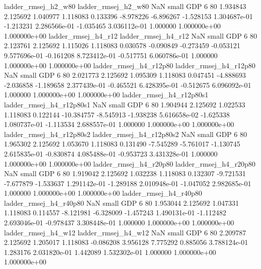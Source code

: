      ladder_rmsej_h2_w80      ladder_rmsej_h2_w80                   NaN      small      GDP                 6 80 1.934843       2.125692 1.040977       1.118083    0.133396     -8.978226     -6.896267    -1.528153   1.304687e-01 -1.213231 2.286566e-01    -1.035465   3.036112e-01            1.000000    1.000000e+00        1.000000e+00
     ladder_rmsej_h4_r12      ladder_rmsej_h4_r12                   NaN      small      GDP                 6 80 2.123761       2.125692 1.115026       1.118083    0.030578     -0.090849     -0.273459    -0.053121   9.577696e-01 -0.161208 8.723412e-01    -0.517751   6.060786e-01            1.000000    1.000000e+00        1.000000e+00
  ladder_rmsej_h4_r12p80   ladder_rmsej_h4_r12p80                   NaN      small      GDP                 6 80 2.021773       2.125692 1.095309       1.118083    0.047451     -4.888693     -2.036858    -1.189658   2.377439e-01 -0.465521 6.428395e-01    -0.512675   6.096092e-01            1.000000    1.000000e+00        1.000000e+00
ladder_rmsej_h4_r12p80s1 ladder_rmsej_h4_r12p80s1                   NaN      small      GDP                 6 80 1.904944       2.125692 1.022533       1.118083    0.122144    -10.384757     -8.545913    -1.938238   5.616658e-02 -1.625338 1.080737e-01    -1.113534   2.688557e-01            1.000000    1.000000e+00        1.000000e+00
ladder_rmsej_h4_r12p80s2 ladder_rmsej_h4_r12p80s2                   NaN      small      GDP                 6 80 1.965302       2.125692 1.053670       1.118083    0.131490     -7.545289     -5.761017    -1.130745   2.615835e-01 -0.830874 4.085488e-01    -0.953723   3.431328e-01            1.000000    1.000000e+00        1.000000e+00
  ladder_rmsej_h4_r20p80   ladder_rmsej_h4_r20p80                   NaN      small      GDP                 6 80 1.919042       2.125692 1.032238       1.118083    0.132307     -9.721531     -7.677879    -1.533637   1.291142e-01 -1.289188 2.010948e-01    -1.047052   2.982685e-01            1.000000    1.000000e+00        1.000000e+00
  ladder_rmsej_h4_r40p80   ladder_rmsej_h4_r40p80                   NaN      small      GDP                 6 80 1.953044       2.125692 1.047331       1.118083    0.114557     -8.121981     -6.328009    -1.457243   1.490131e-01 -1.112482 2.693046e-01    -0.978437   3.308448e-01            1.000000    1.000000e+00        1.000000e+00
     ladder_rmsej_h4_w12      ladder_rmsej_h4_w12                   NaN      small      GDP                 6 80 2.209787       2.125692 1.205017       1.118083   -0.086208      3.956128      7.775292     0.885056   3.788124e-01  1.283176 2.031820e-01     1.442089   1.532302e-01            1.000000    1.000000e+00        1.000000e+00
